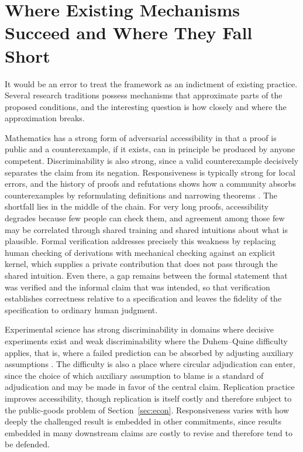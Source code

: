 \documentclass[11pt]{article}
\theoremstyle{remark}
\begin{document}
\section{Where Existing Mechanisms Succeed and Where They Fall Short}

It would be an error to treat the framework as an indictment of existing practice. Several research traditions possess mechanisms that approximate parts of the proposed conditions, and the interesting question is how closely and where the approximation breaks.

Mathematics has a strong form of adversarial accessibility in that a proof is public and a counterexample, if it exists, can in principle be produced by anyone competent. Discriminability is also strong, since a valid counterexample decisively separates the claim from its negation. Responsiveness is typically strong for local errors, and the history of proofs and refutations shows how a community absorbs counterexamples by reformulating definitions and narrowing theorems \cite{lakatos1976}. The shortfall lies in the middle of the chain. For very long proofs, accessibility degrades because few people can check them, and agreement among those few may be correlated through shared training and shared intuitions about what is plausible. Formal verification addresses precisely this weakness by replacing human checking of derivations with mechanical checking against an explicit kernel, which supplies a private contribution that does not pass through the shared intuition. Even there, a gap remains between the formal statement that was verified and the informal claim that was intended, so that verification establishes correctness relative to a specification and leaves the fidelity of the specification to ordinary human judgment.

Experimental science has strong discriminability in domains where decisive experiments exist and weak discriminability where the Duhem--Quine difficulty applies, that is, where a failed prediction can be absorbed by adjusting auxiliary assumptions \cite{duhem1954,quine1951}. The difficulty is also a place where circular adjudication can enter, since the choice of which auxiliary assumption to blame is a standard of adjudication and may be made in favor of the central claim. Replication practice improves accessibility, though replication is itself costly and therefore subject to the public-goods problem of Section~\ref{sec:econ}. Responsiveness varies with how deeply the challenged result is embedded in other commitments, since results embedded in many downstream claims are costly to revise and therefore tend to be defended.
\end{document}
